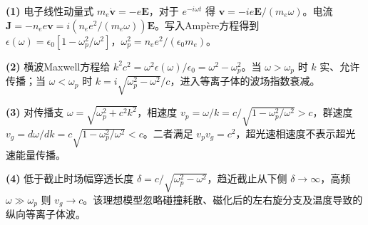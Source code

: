\par\noindent\textbf{(1)} 电子线性动量式 \(m_e\dot{\boldsymbol v}=-e\boldsymbol E\)，对于 \(e^{-i\omega t}\) 得 \(\boldsymbol v=-i e\boldsymbol E/(m_e\omega)\)。电流 \(\boldsymbol J=-n_ee\boldsymbol v=i(n_ee^2/(m_e\omega))\boldsymbol E\)。写入Ampère方程得到 \(\epsilon(\omega)=\epsilon_0[1-\omega_p^2/\omega^2]\)，\(\omega_p^2=n_ee^2/(\epsilon_0m_e)\)。
\par\noindent\textbf{(2)} 横波Maxwell方程给 \(k^2c^2=\omega^2\epsilon(\omega)/\epsilon_0=\omega^2-\omega_p^2\)。当 \(\omega>\omega_p\) 时 \(k\) 实、允许传播；当 \(\omega<\omega_p\) 时 \(k=i\sqrt{\omega_p^2-\omega^2}/c\)，进入等离子体的波场指数衰减。
\par\noindent\textbf{(3)} 对传播支 \(\omega=\sqrt{\omega_p^2+c^2k^2}\)，相速度 \(v_p=\omega/k=c/\sqrt{1-\omega_p^2/\omega^2}>c\)，群速度 \(v_g=d\omega/dk=c\sqrt{1-\omega_p^2/\omega^2}<c\)。二者满足 \(v_pv_g=c^2\)，超光速相速度不表示超光速能量传播。
\par\noindent\textbf{(4)} 低于截止时场幅穿透长度 \(\delta=c/\sqrt{\omega_p^2-\omega^2}\)，趋近截止从下侧 \(\delta\to\infty\)，高频 \(\omega\gg\omega_p\) 则 \(v_g\to c\)。该理想模型忽略碰撞耗散、磁化后的左右旋分支及温度导致的纵向等离子体波。
